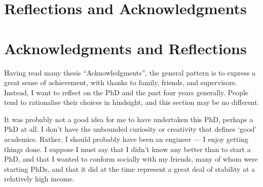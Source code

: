 {}%
%
\chapter*{Reflections and Acknowledgments}\label{ch:ack}


\bigskip

\begingroup
\let\clearpage\relax
\let\cleardoublepage\relax
\let\cleardoublepage\relax
\chapter*{Acknowledgments and Reflections}

Having read many thesis ``Acknowledgments'', the general pattern is to express a great sense of achievement, with thanks to family, friends, and supervisors.
Instead, I want to reflect on the PhD and the past four years generally.
People tend to rationalise their choices in hindsight, and this section may be no different.

It was probably not a good idea for me to have undertaken this PhD, perhaps a PhD at all.
I don't have the unbounded curiosity or creativity that defines `good' academics.
Rather, I should probably have been an engineer --- I enjoy getting things done.
I suppose I must say that I didn't know any better than to start a PhD, and that I wanted to conform socially with my friends, many of whom were starting PhDs, and that it did at the time represent a great deal of stability at a relatively high income.

